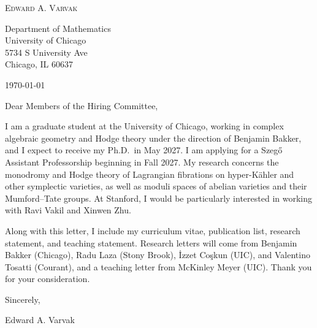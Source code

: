\documentclass[12pt]{article}
\begin{document}
\begin{center}
  {\Large\textsc{Edward A. Varvak}}\\[10pt]
\end{center}

Department of Mathematics \\
University of Chicago \\
5734 S University Ave \\
Chicago, IL 60637

\today

Dear Members of the Hiring Committee,

I am a graduate student at the University of Chicago, working in complex
algebraic geometry and Hodge theory under the direction of Benjamin Bakker,
and I expect to receive my Ph.D.\ in May 2027. I am applying for a Szeg\H{o}
Assistant Professorship beginning in Fall 2027. My research concerns the
monodromy and Hodge theory of Lagrangian fibrations on hyper-K\"ahler and
other symplectic varieties, as well as moduli spaces of abelian varieties and
their Mumford--Tate groups. At Stanford, I would be particularly interested in
working with Ravi Vakil and Xinwen Zhu.

Along with this letter, I include my curriculum vitae, publication list,
research statement, and teaching statement. Research letters will come from
Benjamin Bakker (Chicago), Radu Laza (Stony Brook), \.{I}zzet Co\c{s}kun
(UIC), and Valentino Tosatti (Courant), and a teaching letter from McKinley
Meyer (UIC). Thank you for your consideration.

Sincerely,

Edward A. Varvak
\end{document}
